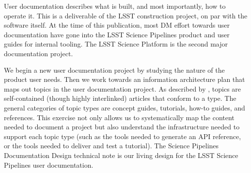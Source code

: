User documentation describes what is built, and most importantly, how to operate it.
This is a deliverable of the LSST construction project, on par with the software itself.
At the time of this publication, most DM effort towards user documentation have gone into the LSST Science Pipelines product\cite{pipelines-guide} and user guides for internal tooling.
The LSST Science Platform\cite{LSE-319} is the second major documentation project.

We begin a new user documentation project by studying the nature of the product user needs.
Then we work towards an information architecture plan that maps out topics in the user documentation project.
As described by , topics are self-contained (though highly interlinked) articles that conform to a type.
The general categories of topic types are concept guides, tutorials, how-to guides, and references.\cite{Procida:2017}
This exercise not only allows us to systematically map the content needed to document a project but also understand the infrastructure needed to support each topic type (such as the tools needed to generate an API reference, or the tools needed to deliver and test a tutorial).
The Science Pipelines Documentation Design\cite{DMTN-030} technical note is our living design for the LSST Science Pipelines user documentation.

